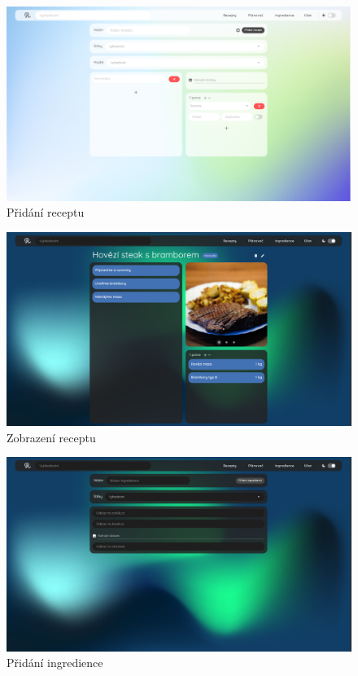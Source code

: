 \vspace*{\fill}
\begin{figure}[H]
    \includegraphics[width=\textwidth]{images/final-look/pridani-receptu}
    \caption{Přidání receptu} \label{picture:recipeo:pridani-receptu}
\end{figure}

\begin{figure}[H]
    \includegraphics[width=\textwidth]{images/final-look/zobrazeni-receptu}
    \caption{Zobrazení receptu} \label{picture:recipeo:zobrazeni-receptu}
\end{figure}
\vspace*{\fill}

\vspace*{\fill}
\begin{figure}[H]
    \includegraphics[width=\textwidth]{images/final-look/pridani-ingredience}
    \caption{Přidání ingredience} \label{picture:recipeo:pridani-ingredience}
\end{figure}


